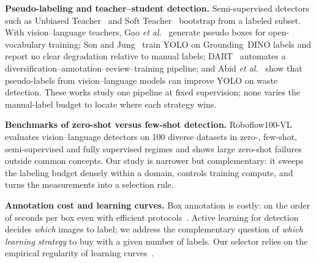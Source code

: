 \textbf{Pseudo-labeling and teacher--student detection.} Semi-supervised detectors such as Unbiased Teacher~\cite{liu2021unbiased} and Soft Teacher~\cite{xu2021softteacher} bootstrap from a labeled subset. With vision--language teachers, Gao \emph{et al.}~\cite{gao2022pseudobox} generate pseudo boxes for open-vocabulary training; Son and Jung~\cite{son2024teacherstudent} train YOLO on Grounding~DINO labels and report no clear degradation relative to manual labels; DART~\cite{xin2024dart} automates a diversification--annotation--review--training pipeline; and Abid \emph{et al.}~\cite{abid2025waste} show that pseudo-labels from vision--language models can improve YOLO on waste detection. These works study one pipeline at fixed supervision; none varies the manual-label budget to locate where each strategy wins.

\textbf{Benchmarks of zero-shot versus few-shot detection.} Roboflow100-VL~\cite{robicheaux2025rf100vl} evaluates vision--language detectors on 100 diverse datasets in zero-, few-shot, semi-supervised and fully supervised regimes and shows large zero-shot failures outside common concepts. Our study is narrower but complementary: it sweeps the labeling budget densely within a domain, controls training compute, and turns the measurements into a selection rule.

\textbf{Annotation cost and learning curves.} Box annotation is costly: on the order of seconds per box even with efficient protocols~\cite{su2012crowdsourcing,papadopoulos2017extreme}. Active learning for detection~\cite{brust2018active} decides \emph{which} images to label; we address the complementary question of \emph{which learning strategy} to buy with a given number of labels. Our selector relies on the empirical regularity of learning curves~\cite{cortes1993curves,hestness2017scaling}.
